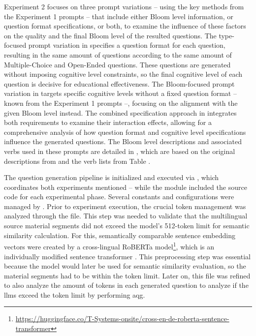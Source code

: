 Experiment 2 focuses on three prompt variations -- using the key methods from the Experiment 1 prompts -- that include either Bloom level information, or question format specifications, or both, to examine the influence of these factors on the quality and the final Bloom level of the resulted questions. The type-focused prompt variation in  specifies a question format for each question, resulting in the same amount of questions according to the same amount of Multiple-Choice and Open-Ended questions. These questions are generated without imposing cognitive level constraints, so the final cognitive level of each question is decisive for educational effectiveness. The Bloom-focused prompt variation in  targets specific cognitive levels without a fixed question format -- known from the Experiment 1 prompts --, focusing on the alignment with the given Bloom level instead. The combined specification approach in  integrates both requirements to examine their interaction effects, allowing for a comprehensive analysis of how question format and cognitive level specifications influence the generated questions. The Bloom level descriptions and associated verbs used in these prompts are detailed in , which are based on the original descriptions from \cite{krathwohl_revision_2002} and the verb lists from Table .

The question generation pipeline is initialized and executed via , which coordinates both experiments mentioned -- while the module  included the source code for each experimental phase. Several constants and configurations were managed by . Prior to experiment execution, the crucial token management was analyzed through the  file. This step was needed to validate that the multilingual source material segments did not exceed the model's 512-token limit for semantic similarity calculation. For this, semantically comparable sentence embedding vectors were created by a cross-lingual RoBERTa model\footnote{\url{https://huggingface.co/T-Systems-onsite/cross-en-de-roberta-sentence-transformer}}, which is an individually modified sentence transformer \cite{reimers_sentence-bert_2019}. This preprocessing step was essential because the model would later be used for semantic similarity evaluation, so the material segments had to be within the token limit. Later on, this file was refined to also analyze the amount of tokens in each generated question to analyze if the \ac{llms} exceed the token limit by performing \ac{aqg}.

